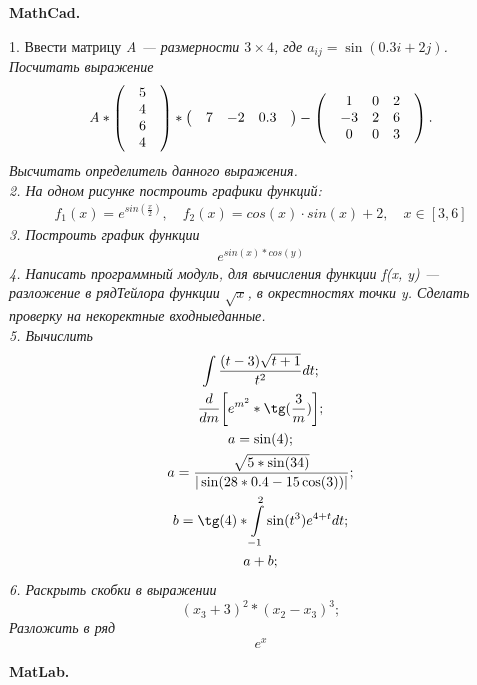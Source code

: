 \documentclass[12pt]{article}
\begin{document}
\begin{center}
\bf \Large MathCad.
\end{center}
1. Ввести матрицу \it A \rm --- размерности $3 \times 4$, где $a_{ij} = \sin (0.3i+2j)$. Посчитать выражение
\[\it A \rm \ast 
\begin{pmatrix} 
& 5 & \\ 
& 4 & \\ 
& 6 & \\ 
& 4 & 
\end{pmatrix}
\ast 
\begin{pmatrix}
& 7 & -2 & 0.3 &
\end{pmatrix}
-
\begin{pmatrix}
& 1 & 0 & 2 &\\
& -3 & 2 & 6 &\\
& 0 & 0 & 3 &\\
\end{pmatrix}
.
\]
Высчитать определитель данного выражения.\\
2. На одном рисунке построить графики функций:
\begin {align*}
f_1(x)=e^{sin(\frac{x}{2})}, \quad f_2(x)=cos(x)\cdot sin(x)+2, \quad x \in [3,6]
\end {align*}
3. Построить график функции
\begin {align*}
e^{sin(x) \ast cos(y)}
\end {align*}
4. Написать программный модуль, для вычисления функции \it f(x, y) \rm --- разложение в ряд\linebreak Тейлора функции $ \sqrt{x} $, в окрестностях точки \it y\rm. Сделать проверку на некоректные входные\linebreak данные.\\
5. Вычислить
\begin {gather*}
\int \frac{(t-3)\sqrt{t+1}}{t^2}dt;\\
\frac{d}{dm}\biggl[e^{m^2} \ast \tg(\frac{3}{m})\biggr];\\
a=\sin(4);\\
a=\frac{\sqrt{5 \ast \sin(34)}}{|\sin(28 \ast 0.4 - 15\cos(3))|};\\
b=\tg(4) \ast \int\limits_{-1}^2  \sin(t^3)e^{4+t}dt;\\
a+b;
\end{gather*}
6. Раскрыть скобки в выражении\\ 
\begin {equation*}
(x_3+3)^2 \ast (x_2-x_3)^3;
\end {equation*}
Разложить в ряд $$e^x$$
\begin{center}
\bf \Large MatLab.
\end{center}
\end{document}
